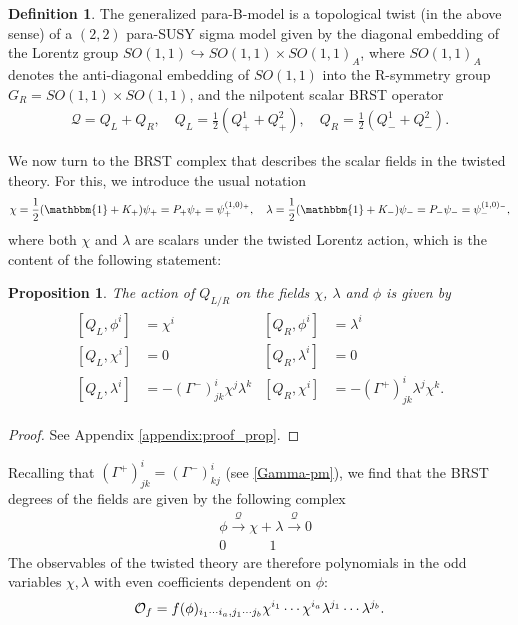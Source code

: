 \documentclass{article}
\newcommand{\QQ}{\mathcal{Q}}
\newcommand{\id}{\mathbbm{1}}
\newtheorem{proposition}[theorem]{Proposition}
\theoremstyle{definition}
\newtheorem{Def}[theorem]{Definition}
\theoremstyle{remark}
\begin{document}
\begin{Def}\label{def:B-twist}
The generalized para-B-model is a topological twist (in the above sense) of a $(2,2)$ para-SUSY sigma model given by the diagonal embedding of the Lorentz group $SO(1,1)\hookrightarrow SO(1,1)\times SO(1,1)_A$, where $SO(1,1)_A$ denotes the anti-diagonal embedding of $SO(1,1)$ into the R-symmetry group $G_R=SO(1,1)\times SO(1,1)$, and the nilpotent scalar BRST operator
\begin{align}\label{QQ_nilpotent}
\QQ=Q_L+Q_R,\quad Q_L=\frac{1}{2}(Q^1_++Q^2_+),\quad Q_R=\frac{1}{2}(Q^1_-+Q^2_-).
\end{align}
\end{Def}
\bigskip
We now turn to the BRST complex that describes the scalar fields in the twisted theory. For this, we introduce the usual notation 
\begin{align*}
\chi=\frac{1}{2}(\id+K_+)\psi_+=P_+\psi_+=\psi_+^{(1,0)_+},\quad\lambda=\frac{1}{2}(\id+K_-)\psi_-=P_-\psi_-=\psi_-^{(1,0)_-},
\end{align*}
where both $\chi$ and $\lambda$ are scalars under the twisted Lorentz action, which is the content of the following statement:
\begin{proposition}\label{prop_toptwist}
The action of $Q_{L/R}$ on the fields $\chi$, $\lambda$ and $\phi$ is given by
\begin{align}\label{eq:Qcoh}
\begin{aligned}
[Q_L,\phi^i]&=\chi^i & [Q_R,\phi^i]&=\lambda^i\\
[Q_L,\chi^i]&=0 & [Q_R,\lambda^i]&=0\\
[Q_L,\lambda^i]&=-(\Gamma^-)^i_{jk}\chi^j\lambda^k & [Q_R,\chi^i]&=-(\Gamma^+)^i_{jk}\lambda^j\chi^k.
\end{aligned}
\end{align}
\end{proposition}
\begin{proof}
See Appendix \ref{appendix:proof_prop}.
\end{proof}
Recalling that $(\Gamma^+)^i_{jk}=(\Gamma^-)^i_{kj}$ (see \eqref{Gamma-pm}), we find that the BRST degrees of the fields are given by the following complex
\begin{align*}
&\phi \overset{\QQ}{\longrightarrow}\chi+\lambda\overset{\QQ}{\longrightarrow} 0\\
&0 \phantom{\longrightarrow\longrightarrow} 1
\end{align*}
\noindent
The observables of the twisted theory are therefore polynomials in the odd variables $\chi,\lambda$ with even coefficients dependent on $\phi$:
\begin{align*}
{\cal O}_f=f(\phi)_{i_1\cdots i_a,j_1\cdots j_b}\chi^{i_1}\cdots\chi^{i_a}\lambda^{j_1}\cdots\lambda^{j_b}.
\end{align*}
\end{document}
